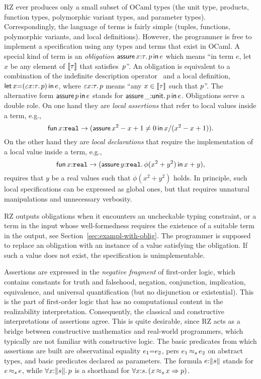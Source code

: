 RZ ever produces only a small subset of OCaml types (the unit type,
products, function types, polymorphic variant types, and parameter
types). Correspondingly, the language of terms is fairly simple
(tuples, functions, polymorphic variants, and local definitions).
However, the programmer is free to implement a specification using any
types and terms that exist in OCaml. A special kind of term is an
\emph{obligation} $\ooblig{\ox}{\oty}{\op}{\oe}$ which means ``in term
$e$, let $x$ be any element of $\values{\oty}$ that satisfies~$\op$''.
An obligation is equivalent to a combination of the indefinite
description operator~\cite{epsilon-reference} and a local definition,
$\olet{\ox}{(\varepsilon \ox {:} \oty.\,\op)}{\oe}$, where
$\varepsilon \ox {:} \oty.\, \op$ means ``any $x \in \values{\oty}$
such that $\op$''. The alternative form $\oobligx{\op}{\oe}$ stands
for $\ooblig{\_}{\ounit}{\op}{\oe}$. Obligations serve a double role.
On one hand they are \emph{local assertions} that refer to local
values inside a term, e.g.,
%
\begin{equation*}
  \olambda{x}{\mathtt{real}}{(\oobligx{x^2-x+1 \neq 0}{x/(x^2-x+1)})}.
\end{equation*}
%
On the other hand they are \emph{local declarations} that require the
implementation of a local value inside a term, e.g.,
%
\begin{equation*}
  \olambda{x}{\mathtt{real}}{(
    \ooblig{y}{\mathtt{real}}{\phi(x^2+y^2)}{x+y}
    )},
\end{equation*}
%
requires that $y$ be a real values such that $\phi(x^2+y^2)$ holds. In
principle, such local specifications can be expressed as global ones,
but that requires unnatural manipulations and unnecessary verbosity.

RZ outputs obligations when it encounters an uncheckable typing
constraint, or a term in the input whose well-formedness requires the
existence of a suitable term in the output, see
Section~\ref{sec:exampl-with-oblig}. The programmer is supposed to
replace an obligation with an instance of a value satisfying the
obligation. If such a value does not exist, the specification is
unimplementable.

Assertions are expressed in the \emph{negative fragment} of
first-order logic, which contains constants for truth and falsehood,
negation, conjunction, implication, equivalence, and universal
quantification (but no disjunction or existential). This is the part
of first-order logic that has no computational content in the
realizability interpretation. Consequently, the classical and
constructive interpretations of assertions agree. This is quite
desirable, since RZ acts as a bridge between constructive mathematics
and real-world programmers, which typically are not familiar with
constructive logic. The basic predicates from which assertions are
built are observatinal equality $\oequal{\oe_1}{\oe_2}$, pers
$\oper{s}{\oe_1}{\oe_2}$ on abstract types, and basic predicates
declared as parameters. The formula $\ototal{\oe}{\os}$ stands for
$\oper{\os}{\oe}{\oe}$, while $\oforallt{\ox}{\os}{\op}$ is a
shorthand for
$\oforall{\ox}{\os}{(\oimply{\oper{\os}{\ox}{\ox}}{p})}$.

